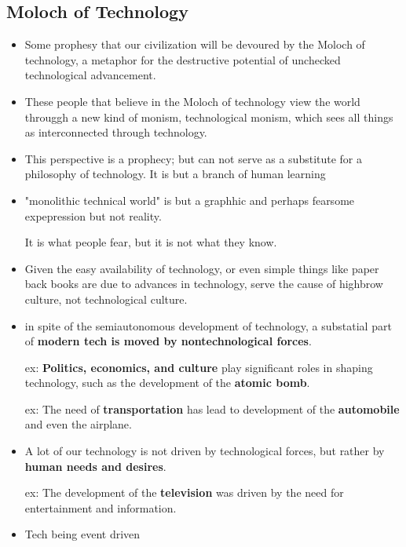 \documentclass{article}
\begin{document}
\subsection{Moloch of Technology}
\begin{itemize}
  \item Some prophesy that our civilization will be devoured by the Moloch of technology,
    a metaphor for the destructive potential of unchecked technological advancement.
  \item These people that believe in the Moloch of technology view the world througgh a new kind of monism, technological monism,
    which sees all things as interconnected through technology.
  \item This perspective is a prophecy; but can not serve as a substitute
    for a philosophy of technology. It is but a branch of human learning
  \item "monolithic technical world" is but a graphhic and perhaps fearsome expepression but not reality.

    It is what people fear, but it is not what they know.
  \item Given the easy availability of technology, or even simple
    things like paper back books are due to advances in technology,
    serve the cause of highbrow culture, not technological culture.
  \item in spite of the semiautonomous development of technology,
    a substatial part of \textbf{modern tech is moved by nontechnological forces}.

    ex: \textbf{Politics, economics, and culture} play significant roles in shaping technology,
    such as the development of the \textbf{atomic bomb}.

    ex: The need of \textbf{transportation} has lead to development of the \textbf{automobile} and even
    the airplane.
  \item A lot of our technology is not driven by technological forces, but rather by
    \textbf{human needs and desires}.

    ex: The development of the \textbf{television} was driven by the need for entertainment and information.
  \item Tech being event driven

\end{itemize}

\newpage{}
\end{document}
